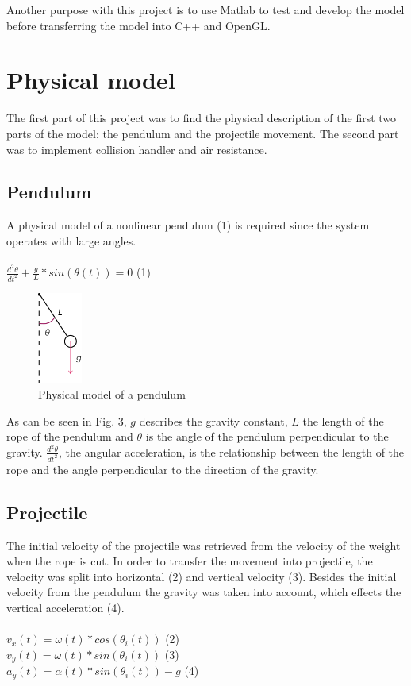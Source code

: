 \documentclass[a4paper,12pt,twoside,english]{article}
\begin{document}
Another purpose with this project is to use Matlab to test and develop the model before transferring the model into C++ and OpenGL. 

\section{Physical model}
The first part of this project was to find the physical description of the first two parts of the model: the pendulum and the projectile movement. The second part was to implement collision handler and air resistance. 
\subsection{Pendulum}
A physical model of a nonlinear pendulum (1) is required since the system operates with large angles. \\ \\
$\frac{d^2\theta}{dt^2} + \frac{g}{L}*sin(\theta(t)) = 0$ \hfill (1) \\ 

\begin{figure}[h]
\centering
\includegraphics[height=3cm]{bilder/pendulum_2.png}
\caption{Physical model of a pendulum}
\end{figure}

As can be seen in Fig. 3, $g$ describes the gravity constant, $L$ the length of the rope of the pendulum and $\theta$ is the angle of the pendulum perpendicular to the gravity.  $\frac{d^2\theta}{dt^2}$, the angular acceleration, is the relationship between the length of the rope and the angle perpendicular to the direction of the gravity. 

\subsection{Projectile}
The initial velocity of the projectile was retrieved from the velocity of the weight when the rope is cut. In order to transfer the movement into projectile, the velocity was split into horizontal (2) and vertical velocity (3). Besides the initial velocity from the pendulum the gravity was taken into account, which effects the vertical acceleration (4). \\ \\
$v_x(t) = \omega(t) * cos(\theta_i(t))$ \hfill (2) \\
$v_y(t) = \omega(t) * sin(\theta_i(t))$ \hfill (3) \\
$a_y(t) = \alpha(t) * sin(\theta_i(t)) - g$ \hfill (4) \\
\end{document}

